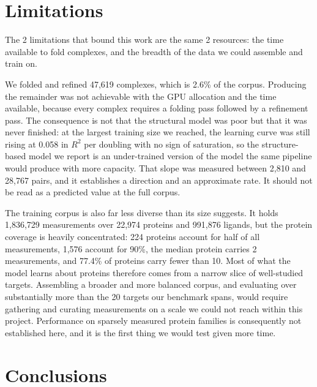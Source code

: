 \documentclass[times, twoside]{zHenriquesLab-StyleBioRxiv}
\begin{document}
\section*{Limitations}

The 2 limitations that bound this work are the same 2 resources: the time available to fold complexes, and the breadth of the data we could assemble and train on.

We folded and refined 47,619 complexes, which is 2.6\% of the corpus. Producing the remainder was not achievable with the GPU allocation and the time available, because every complex requires a folding pass followed by a refinement pass. The consequence is not that the structural model was poor but that it was never finished: at the largest training size we reached, the learning curve was still rising at 0.058 in $R^2$ per doubling with no sign of saturation, so the structure-based model we report is an under-trained version of the model the same pipeline would produce with more capacity. That slope was measured between 2,810 and 28,767 pairs, and it establishes a direction and an approximate rate. It should not be read as a predicted value at the full corpus.

The training corpus is also far less diverse than its size suggests. It holds 1,836,729 measurements over 22,974 proteins and 991,876 ligands, but the protein coverage is heavily concentrated: 224 proteins account for half of all measurements, 1,576 account for 90\%, the median protein carries 2 measurements, and 77.4\% of proteins carry fewer than 10. Most of what the model learns about proteins therefore comes from a narrow slice of well-studied targets. Assembling a broader and more balanced corpus, and evaluating over substantially more than the 20 targets our benchmark spans, would require gathering and curating measurements on a scale we could not reach within this project. Performance on sparsely measured protein families is consequently not established here, and it is the first thing we would test given more time.

\section*{Conclusions}
\end{document}
